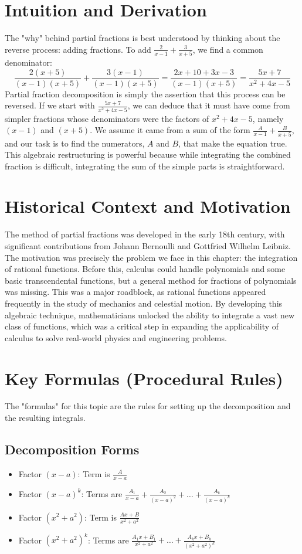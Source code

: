 \documentclass{article}
\begin{document}
\section{Intuition and Derivation}
The "why" behind partial fractions is best understood by thinking about the reverse process: adding fractions. To add $\frac{2}{x-1} + \frac{3}{x+5}$, we find a common denominator:
\[ \frac{2(x+5)}{(x-1)(x+5)} + \frac{3(x-1)}{(x-1)(x+5)} = \frac{2x+10+3x-3}{(x-1)(x+5)} = \frac{5x+7}{x^2+4x-5} \]
Partial fraction decomposition is simply the assertion that this process can be reversed. If we start with $\frac{5x+7}{x^2+4x-5}$, we can deduce that it must have come from simpler fractions whose denominators were the factors of $x^2+4x-5$, namely $(x-1)$ and $(x+5)$. We assume it came from a sum of the form $\frac{A}{x-1} + \frac{B}{x+5}$, and our task is to find the numerators, $A$ and $B$, that make the equation true. This algebraic restructuring is powerful because while integrating the combined fraction is difficult, integrating the sum of the simple parts is straightforward.

\section{Historical Context and Motivation}
The method of partial fractions was developed in the early 18th century, with significant contributions from Johann Bernoulli and Gottfried Wilhelm Leibniz. The motivation was precisely the problem we face in this chapter: the integration of rational functions. Before this, calculus could handle polynomials and some basic transcendental functions, but a general method for fractions of polynomials was missing. This was a major roadblock, as rational functions appeared frequently in the study of mechanics and celestial motion. By developing this algebraic technique, mathematicians unlocked the ability to integrate a vast new class of functions, which was a critical step in expanding the applicability of calculus to solve real-world physics and engineering problems.

\section{Key Formulas (Procedural Rules)}
The "formulas" for this topic are the rules for setting up the decomposition and the resulting integrals.

\subsection{Decomposition Forms}
\begin{itemize}
    \item Factor $(x-a)$: Term is $\frac{A}{x-a}$
    \item Factor $(x-a)^k$: Terms are $\frac{A_1}{x-a} + \frac{A_2}{(x-a)^2} + \dots + \frac{A_k}{(x-a)^k}$
    \item Factor $(x^2+a^2)$: Term is $\frac{Ax+B}{x^2+a^2}$
    \item Factor $(x^2+a^2)^k$: Terms are $\frac{A_1x+B_1}{x^2+a^2} + \dots + \frac{A_kx+B_k}{(x^2+a^2)^k}$
\end{itemize}
\end{document}
